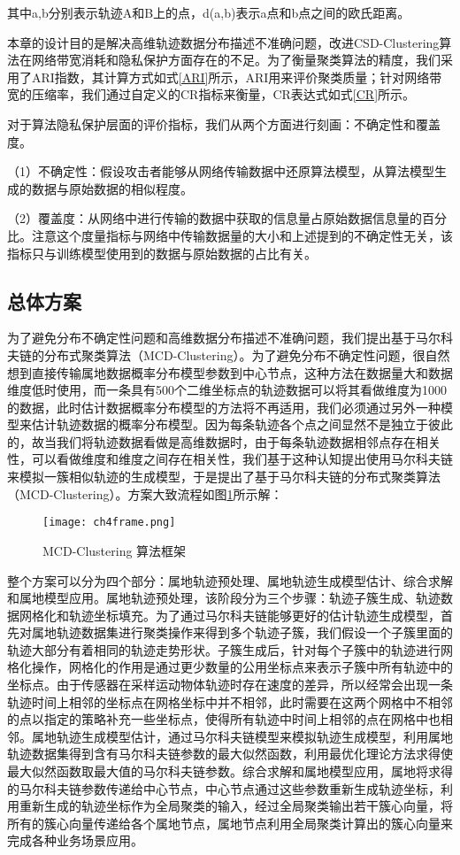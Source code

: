 其中a,b分别表示轨迹A和B上的点，d(a,b)表示a点和b点之间的欧氏距离。

本章的设计目的是解决高维轨迹数据分布描述不准确问题，改进CSD-Clustering算法在网络带宽消耗和隐私保护方面存在的不足。为了衡量聚类算法的精度，我们采用了ARI指数，其计算方式如式\ref{ARI}所示，ARI用来评价聚类质量；针对网络带宽的压缩率，我们通过自定义的CR指标来衡量，CR表达式如式\ref{CR}所示。

对于算法隐私保护层面的评价指标，我们从两个方面进行刻画：不确定性和覆盖度。

（1）不确定性：假设攻击者能够从网络传输数据中还原算法模型，从算法模型生成的数据与原始数据的相似程度。

（2）覆盖度：从网络中进行传输的数据中获取的信息量占原始数据信息量的百分比。注意这个度量指标与网络中传输数据量的大小和上述提到的不确定性无关，该指标只与训练模型使用到的数据与原始数据的占比有关。

\subsection{总体方案}

为了避免分布不确定性问题和高维数据分布描述不准确问题，我们提出基于马尔科夫链的分布式聚类算法（MCD-Clustering）。为了避免分布不确定性问题，很自然想到直接传输属地数据概率分布模型参数到中心节点，这种方法在数据量大和数据维度低时使用，而一条具有500个二维坐标点的轨迹数据可以将其看做维度为1000的数据，此时估计数据概率分布模型的方法将不再适用，我们必须通过另外一种模型来估计轨迹数据的概率分布模型。因为每条轨迹各个点之间显然不是独立于彼此的，故当我们将轨迹数据看做是高维数据时，由于每条轨迹数据相邻点存在相关性，可以看做维度和维度之间存在相关性，我们基于这种认知提出使用马尔科夫链来模拟一簇相似轨迹的生成模型，于是提出了基于马尔科夫链的分布式聚类算法（MCD-Clustering）。方案大致流程如图\ref{ch4frame}所示解：
\begin{figure}[H]
	\texttt{[image: ch4frame.png]}
	\caption{MCD-Clustering 算法框架}
	\label{ch4frame}
\end{figure}

整个方案可以分为四个部分：属地轨迹预处理、属地轨迹生成模型估计、综合求解和属地模型应用。属地轨迹预处理，该阶段分为三个步骤：轨迹子簇生成、轨迹数据网格化和轨迹坐标填充。为了通过马尔科夫链能够更好的估计轨迹生成模型，首先对属地轨迹数据集进行聚类操作来得到多个轨迹子簇，我们假设一个子簇里面的轨迹大部分有着相同的轨迹走势形状。子簇生成后，针对每个子簇中的轨迹进行网格化操作，网格化的作用是通过更少数量的公用坐标点来表示子簇中所有轨迹中的坐标点。由于传感器在采样运动物体轨迹时存在速度的差异，所以经常会出现一条轨迹时间上相邻的坐标点在网格坐标中并不相邻，此时需要在这两个网格中不相邻的点以指定的策略补充一些坐标点，使得所有轨迹中时间上相邻的点在网格中也相邻。属地轨迹生成模型估计，通过马尔科夫链模型来模拟轨迹生成模型，利用属地轨迹数据集得到含有马尔科夫链参数的最大似然函数，利用最优化理论方法求得使最大似然函数取最大值的马尔科夫链参数。综合求解和属地模型应用，属地将求得的马尔科夫链参数传递给中心节点，中心节点通过这些参数重新生成轨迹坐标，利用重新生成的轨迹坐标作为全局聚类的输入，经过全局聚类输出若干簇心向量，将所有的簇心向量传递给各个属地节点，属地节点利用全局聚类计算出的簇心向量来完成各种业务场景应用。


